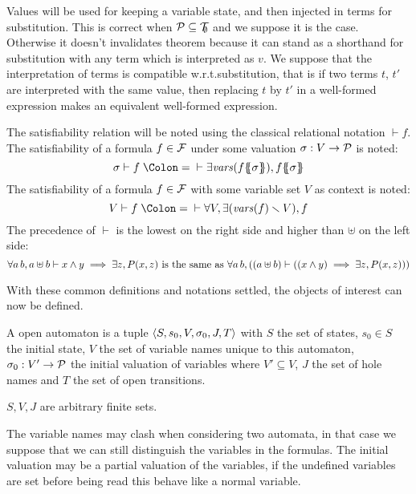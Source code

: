 \documentclass{article}
\begin{document}
Values will be used for keeping a variable state, and then injected in terms for substitution.
This is correct when \(\mathcal{P} \subseteq {\mathcal{T}}_{\!\!\emptyset}\) and we suppose it is the case.
Otherwise it doesn't invalidates theorem because it can stand as a shorthand for substitution with any term which is interpreted as \(v\).
We suppose that the interpretation of terms is compatible w.r.t.\@ substitution, that is if two terms \(t\), \(t'\) are interpreted with the same value, then replacing \(t\) by \(t'\) in a well-formed expression makes an equivalent well-formed expression.
\begin{noti}
 The satisfiability relation will be noted using the classical relational notation \(\vdash f\).
 The satisfiability of a formula \(f \in {\mathcal{F}}\) under some valuation \(\sigma: V \to \mathcal{P}\) is noted:
\[ \sigma \vdash f \defnotation \vdash \exists \fvars{f\psubst{\sigma}}, f\psubst{\sigma} \]
 The satisfiability of a formula \(f \in {\mathcal{F}}\) with some variable set \(V\) as context is noted:
\[ V \vdash f \defnotation \vdash \forall V, \exists\mpar{\fvars{f} \setminus V}, f \]
 The precedence of \(\vdash\) is the lowest on the right side and higher than \(\uplus\) on the left side:
\[ \forall a \, b, a \uplus b \vdash x \wedge y \implies \exists z, P{\left(x,z\right)} \text{ is the same as } \forall a \, b, {\left({\left(a \uplus b\right)} \vdash {\left({\left(x \wedge y\right)} \implies \exists z, P{\left(x,z\right)}\right)}\right)} \]
\end{noti}
With these common definitions and notations settled, the objects of interest can now be defined.
\begin{defi}
A open automaton is a tuple \(\left<S,s_0,V,\sigma_0,J,T\right>\) with \(S\) the set of states, \(s_0 \in S\) the initial state, \(V\) the set of variable names unique to this automaton, \(\sigma_0: V' \to \mathcal{P}\) the initial valuation of variables where \(V' \subseteq V\), \(J\) the set of hole names and \(T\) the set of open transitions.

\(S, V, J\) are arbitrary finite sets.
\end{defi}
The variable names may clash when considering two automata, in that case we suppose that we can still distinguish the variables in the formulas.
The initial valuation may be a partial valuation of the variables, if the undefined variables are set before being read this behave like a normal variable.
\end{document}
